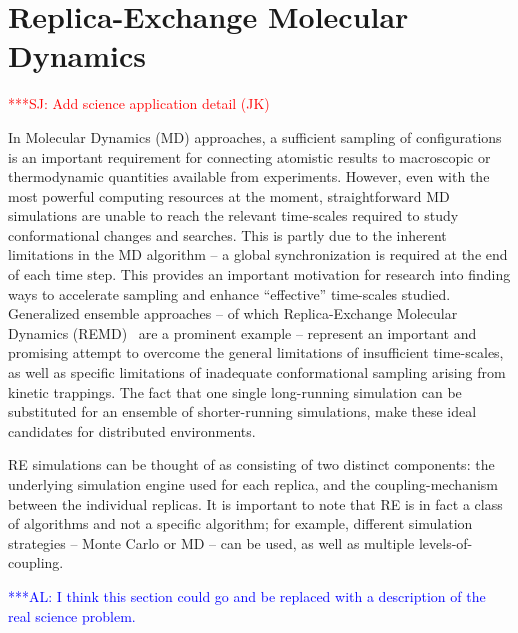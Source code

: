 \documentclass{rspublic}
\newcommand{\alnote}[1]{ {\textcolor{blue} { ***AL: #1 }}}
\newcommand{\jhanote}[1]{ {\textcolor{red} { ***SJ: #1 }}}
\newcommand{\alnote}[1]{}
\newcommand{\jhanote}[1]{}
\begin{document}
\section{Replica-Exchange Molecular Dynamics}

\jhanote{Add science application detail (JK)}

In Molecular Dynamics (MD) approaches, a sufficient sampling of
configurations is an important requirement for connecting atomistic
results to macroscopic or thermodynamic quantities available from
experiments.  However, even with the most powerful computing resources
at the moment, straightforward MD simulations are unable to reach the
relevant time-scales required to study conformational changes and
searches. This is partly due to the inherent limitations in the MD
algorithm -- a global synchronization is required at the end of each
time step.  This provides an important motivation for research into
finding ways to accelerate sampling and enhance ``effective''
time-scales studied. Generalized ensemble approaches -- of which
Replica-Exchange Molecular Dynamics (REMD)~\citep{Sugita:1999rm} are a
prominent example -- represent an important and promising attempt to
overcome the general limitations of insufficient time-scales, as well
as specific limitations of inadequate conformational sampling arising
from kinetic trappings.  The fact that one single long-running
simulation can be substituted for an ensemble of shorter-running
simulations, make these ideal candidates for distributed environments.

RE simulations can be thought of as consisting of two distinct
components: the underlying simulation engine used for each replica,
and the coupling-mechanism between the individual replicas.  It is
important to note that RE is in fact a class of algorithms and not a
specific algorithm;%
for example, different simulation strategies -- Monte Carlo or MD --
can be used, as well as multiple levels-of-coupling.

\alnote{I think this section could go and be replaced with a
  description of the real science problem.}  


\end{document}
